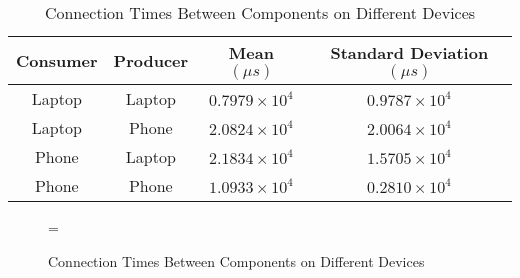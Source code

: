 \documentclass[12pt,twoside,notitlepage]{report}
\begin{document}
\begin{table}[tbh]
\centering

\begin{tabular}{c c c c}
\hline\hline

Consumer & Producer & Mean \begin{math} (\mu s) \end{math} & Standard Deviation  \begin{math} (\mu s) \end{math} \\
\hline

Laptop	&	Laptop	& \begin{math} 0.7979\times10^4	\end{math} & \begin{math} 0.9787\times10^4 \end{math} \\
Laptop	&	Phone	& \begin{math} 2.0824\times10^4	\end{math} & \begin{math} 2.0064\times10^4 \end{math} \\
Phone	&	Laptop	& \begin{math} 2.1834\times10^4	\end{math} & \begin{math} 1.5705\times10^4 \end{math} \\
Phone	& Phone	& \begin{math} 1.0933\times10^4	\end{math} & \begin{math} 0.2810\times10^4 \end{math} \\
\hline
\end{tabular}

\caption{Connection Times Between Components on Different Devices}
\label{tab:map_times}
\end{table}

\begin{figure}[tbh]
\epsfxsize=\hsize
\centerline{}
\caption{Connection Times Between Components on Different Devices}
\label{fig:map_times}
\end{figure}
\end{document}

